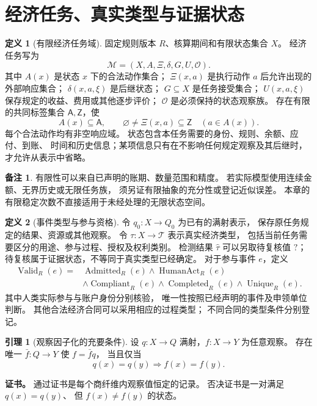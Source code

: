 \documentclass[UTF8,12pt,a4paper,openany,fontset=none,zihao=false]{ctexrep}
\theoremstyle{definition}
\newtheorem{definition}{定义}[chapter]
\newtheorem{lemma}{引理}[chapter]
\newtheorem{remark}{备注}[chapter]
\newenvironment{certificate}{\par\noindent\textbf{证书。}\ignorespaces}{\par}
\newcommand{\1}{\mathbf 1}
\begin{document}
\section{经济任务、真实类型与证据状态}
\begin{definition}[有限经济任务域]
\label{q:task}
固定规则版本 \(R\)、核算期间和有限状态集合 \(X\)。
经济任务写为
\[
\mathcal M=(X,A,\Xi,\delta,G,U,\mathcal O).
\]
其中 \(A(x)\) 是状态 \(x\) 下的合法动作集合；
\(\Xi(x,a)\) 是执行动作 \(a\) 后允许出现的外部响应集合；
\(\delta(x,a,\xi)\) 是后继状态；
\(G\subseteq X\) 是任务接受集合；
\(U(x,a,\xi)\) 保存规定的收益、费用或其他逐步评价；
\(\mathcal O\) 是必须保持的状态观察族。
存在有限的共同标签集合 \(\mathsf A,\mathsf Z\)，使
\[
A(x)\subseteq\mathsf A,\qquad
\varnothing\ne\Xi(x,a)\subseteq\mathsf Z
\quad(a\in A(x)).
\]
每个合法动作均有非空响应域。
状态包含本任务需要的身份、规则、余额、应付、到账、
时间和历史信息；某项信息只有在不影响任何规定观察及其后继时，
才允许从表示中省略。
\end{definition}
\begin{remark}
有限性可以来自已声明的账期、数量范围和精度。
若实际模型使用连续金额、无界历史或无限任务族，
须另证有限抽象的充分性或登记近似误差。
本章的有限稳定次数不直接适用于未经处理的无限状态空间。
\end{remark}
\begin{definition}[事件类型与参与资格]
\label{q:typing}
令 \(q_0:X\to Q_0\) 为已有的满射表示，
保存原任务规定的结果、资源或其他观察。
令 \(\tau:X\to\mathcal T\) 表示真实经济类型，
包括当前任务需要区分的用途、参与过程、授权及权利类别。
检测结果 \(\widehat\tau\) 可以另取待复核值 \(?\)；
待复核属于证据状态，不等同于真实类型已经确定。
对于参与事件 \(e\)，定义
\[
\begin{aligned}
\operatorname{Valid}_R(e)
={}&\operatorname{Admitted}_R(e)
\land\operatorname{HumanAct}_R(e)\\
&\land\operatorname{Compliant}_R(e)
\land\operatorname{Completed}_R(e)
\land\operatorname{Unique}_R(e).
\end{aligned}
\]
其中人类实际参与与账户身份分别核验，
唯一性按照已经声明的事件及申领单位判断。
其他合法经济合同可以采用相应的过程类型；
不同合同的类型条件分别登记。
\end{definition}
\begin{lemma}[观察因子化的充要条件]
\label{q:fiber}
设 \(q:X\to Q\) 满射，\(f:X\to Y\) 为任意观察。
存在唯一 \(\bar f:Q\to Y\) 使 \(f=\bar f q\)，
当且仅当
\[
q(x)=q(y)\Longrightarrow f(x)=f(y).
\]
\end{lemma}
\begin{certificate}
通过证书是每个商纤维内观察值恒定的记录。
否决证书是一对满足 \(q(x)=q(y)\)、
但 \(f(x)\ne f(y)\) 的状态。
\end{certificate}
\end{document}
